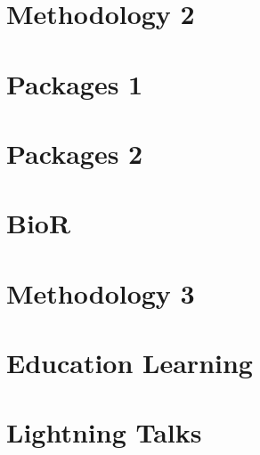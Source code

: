 \documentclass[11pt,oneside]{book}
\begin{document}
\chapter{Methodology 2}





\chapter{Packages 1}


% 



\chapter{Packages 2}



% 
% 


\chapter{BioR}






\chapter{Methodology 3}

% 



\chapter{Education Learning}





\chapter{Lightning Talks}





% 







\end{document}
